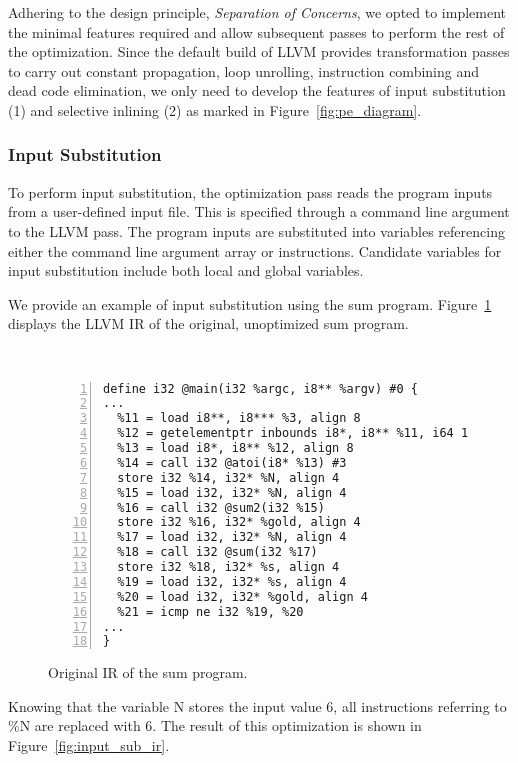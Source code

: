 Adhering to the design principle, \textit{Separation of Concerns}, we opted to implement the minimal features required and allow subsequent passes to perform the rest of the optimization.
Since the default build of LLVM provides transformation passes to carry out constant propagation, loop unrolling, instruction combining and dead code elimination, we only need to develop the features of input substitution (1) and selective inlining (2) as marked in Figure~\ref{fig:pe_diagram}.

\bigbreak
\subsubsection{Input Substitution}

To perform input substitution, the optimization pass reads the program inputs from a user-defined input file. 
This is specified through a command line argument to the LLVM pass. 
The program inputs are substituted into variables referencing either the  command line argument array or  instructions.
Candidate variables for input substitution include both local and global variables.

We provide an example of input substitution using the sum program.
Figure~\ref{fig:original_ir} displays the LLVM IR of the original, unoptimized sum program.

\begin{figure}[htbp]\
\begin{Verbatim}[frame=single,fontsize={\scriptsize},numbers=left,numbersep=5pt,xleftmargin=10pt]
define i32 @main(i32 %argc, i8** %argv) #0 {
...
  %11 = load i8**, i8*** %3, align 8
  %12 = getelementptr inbounds i8*, i8** %11, i64 1
  %13 = load i8*, i8** %12, align 8
  %14 = call i32 @atoi(i8* %13) #3
  store i32 %14, i32* %N, align 4
  %15 = load i32, i32* %N, align 4
  %16 = call i32 @sum2(i32 %15)
  store i32 %16, i32* %gold, align 4
  %17 = load i32, i32* %N, align 4
  %18 = call i32 @sum(i32 %17)
  store i32 %18, i32* %s, align 4
  %19 = load i32, i32* %s, align 4
  %20 = load i32, i32* %gold, align 4
  %21 = icmp ne i32 %19, %20
...
}
\end{Verbatim}
\caption{Original IR of the sum program.}
\label{fig:original_ir}
\end{figure}

Knowing that the variable N stores the input value 6, all instructions referring to \%N are replaced with 6.
The result of this optimization is shown in Figure~\ref{fig:input_sub_ir}. 


